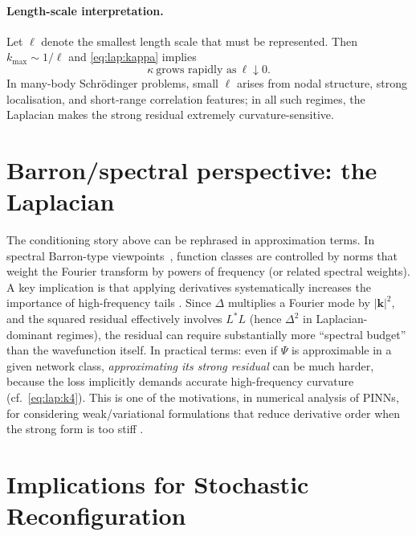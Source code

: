 \paragraph{Length-scale interpretation.}
Let $\ell$ denote the smallest length scale that must be represented.
Then $k_{\max}\sim 1/\ell$ and \eqref{eq:lap:kappa} implies
\begin{equation}
\kappa \ \text{grows rapidly as}\ \ell\downarrow 0.
\end{equation}
In many-body Schr\"odinger problems, small $\ell$ arises from nodal structure,
strong localisation, and short-range correlation features; in all such regimes,
the Laplacian makes the strong residual extremely curvature-sensitive.

\section{Barron/spectral perspective: the Laplacian}
\label{app:laplacian:barron}

The conditioning story above can be rephrased in approximation terms.
In spectral Barron-type viewpoints~\cite{Barron1993-UniversalApprox}, function classes are controlled by norms that
weight the Fourier transform by powers of frequency (or related spectral weights).
A key implication is that applying derivatives systematically increases the
importance of high-frequency tails \cite{De_Ryck_2024}.
Since $\Delta$ multiplies a Fourier mode by $|\mathbf k|^2$, and the squared
residual effectively involves $L^\ast L$ (hence $\Delta^2$ in Laplacian-dominant
regimes), the residual can require substantially more ``spectral budget'' than
the wavefunction itself.
In practical terms: even if $\Psi$ is approximable in a given network class,
\emph{approximating its strong residual} can be much harder, because the loss
implicitly demands accurate high-frequency curvature (cf.\ \eqref{eq:lap:k4}).
This is one of the motivations, in numerical analysis of PINNs, for considering
weak/variational formulations that reduce derivative order when the strong form
is too stiff \cite{De_Ryck_2024}.

\section{Implications for Stochastic Reconfiguration}
\label{app:laplacian:sr}

